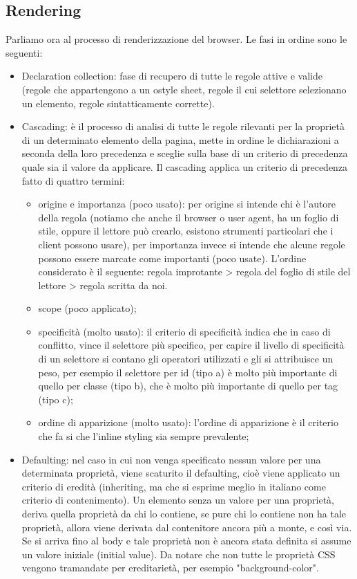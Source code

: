 \subsection{Rendering}
Parliamo ora al processo di renderizzazione del browser.\newline
Le fasi in ordine sono le seguenti:
\begin{itemize}
    \item Declaration collection: fase di recupero di tutte le regole attive e valide (regole che appartengono a un ostyle sheet, regole il cui selettore selezionano un elemento, regole sintatticamente corrette).
    \item Cascading: è il processo di analisi di tutte le regole rilevanti per la proprietà di un determinato elemento della pagina, mette in ordine le dichiarazioni a seconda della loro precedenza e sceglie sulla base di un criterio di precedenza quale sia il valore da applicare.\newline
    Il cascading applica un criterio di precedenza fatto di quattro termini:
    \begin{itemize}
        \item origine e importanza (poco usato): per origine si intende chi è l'autore della regola (notiamo che anche il browser o user agent, ha un foglio di stile, oppure il lettore può crearlo, esistono strumenti particolari che i client possono usare), per importanza invece si intende che alcune regole possono essere marcate come importanti (poco usate). L'ordine considerato è il seguente: regola improtante > regola del foglio di stile del lettore > regola scritta da noi.
        \item scope (poco applicato);
        \item specificità (molto usato): il criterio di specificità indica che in caso di conflitto, vince il selettore più specifico, per capire il livello di specificità di un selettore si contano gli operatori utilizzati e gli si attribuisce un peso, per esempio il selettore per id (tipo a) è molto più importante di quello per classe (tipo b), che è molto più importante di quello per tag (tipo c);
        \item ordine di apparizione (molto usato): l'ordine di apparizione è il criterio che fa si che l'inline styling sia sempre prevalente;
    \end{itemize}
    \item  Defaulting: nel caso in cui non venga specificato nessun valore per una determinata proprietà, viene scaturito il defaulting, cioè viene applicato un criterio di eredità (inheriting, ma che si esprime meglio in italiano come criterio di contenimento). Un elemento senza un valore per una proprietà, deriva quella proprietà da chi lo contiene, se pure chi lo contiene non ha tale proprietà, allora viene derivata dal contenitore ancora più a monte, e così via. Se si arriva fino al body e tale proprietà non è ancora stata definita si assume un valore iniziale (initial value). Da notare che non tutte le proprietà CSS vengono tramandate per ereditarietà, per esempio "background-color".

\end{itemize}
